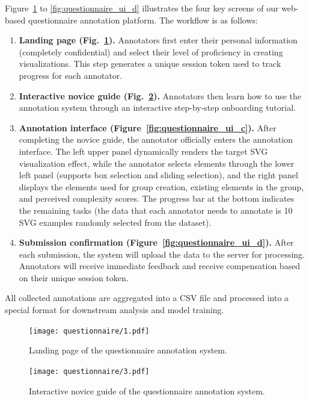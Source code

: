 \documentclass[journal]{IEEEtran}
\begin{document}
Figure~\ref{fig:questionnaire_ui_a} to \ref{fig:questionnaire_ui_d} illustrates the four key screens of our web-based questionnaire annotation platform. The workflow is as follows:
\begin{enumerate}
    \item \textbf{Landing page (Fig.~\ref{fig:questionnaire_ui_a}).} Annotators first enter their personal information (completely confidential) and select their level of proficiency in creating visualizations. This step generates a unique session token used to track progress for each annotator.
    \item \textbf{Interactive novice guide (Fig.~\ref{fig:questionnaire_ui_b}).} Annotators then learn how to use the annotation system through an interactive step-by-step onboarding tutorial.
    \item \textbf{Annotation interface (Figure~\ref{fig:questionnaire_ui_c}). } After completing the novice guide, the annotator officially enters the annotation interface. The left upper panel dynamically renders the target SVG visualization effect, while the annotator selects elements through the lower left panel (supports box selection and sliding selection), and the right panel displays the elements used for group creation, existing elements in the group, and perceived complexity scores. The progress bar at the bottom indicates the remaining tasks (the data that each annotator needs to annotate is 10 SVG examples randomly selected from the dataset).
    \item \textbf{Submission confirmation (Figure~\ref{fig:questionnaire_ui_d}). } After each submission, the system will upload the data to the server for processing. Annotators will receive immediate feedback and receive compensation based on their unique session token.
\end{enumerate}
All collected annotations are aggregated into a CSV file and processed into a special format for downstream analysis and model training.
\begin{figure}[!htbp]
    \centering
    \texttt{[image: questionnaire/1.pdf]}
    \caption{Landing page of the questionnaire annotation system.}
    \label{fig:questionnaire_ui_a}
\end{figure}

\begin{figure}[!htbp]
    \centering
    \texttt{[image: questionnaire/3.pdf]}
    \caption{Interactive novice guide of the questionnaire annotation system.}
    \label{fig:questionnaire_ui_b}
\end{figure}
\end{document}
